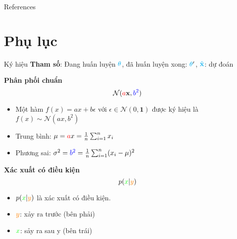 



\begin{frame}[allowframebreaks]{References}
	{\footnotesize
    \printbibliography}
\end{frame}


\appendix

\section{Phụ lục}

\begin{frame}{Ký hiệu}
	\textbf{Tham số}: Đang huấn luyện {\Large$\textcolor{cyan}{\theta}$}, đã huấn luyện xong: {\Large$\textcolor{cyan}{\theta}'$}, {\Large$\textcolor{cyan}{\hat{\mathbf{x}}}$}: dự đoán
	\vspace{-5pt}
	
	\textbf{Phân phối chuẩn}
	\vspace{-5pt}
	{\Large $$\mathcal{N}(\textcolor{red}{a} \mathbf{x}, \textcolor{blue}{b^2})$$}
	\vspace{-15pt}
	\begin{itemize}
		\item Một hàm $f(x) = a x + b\epsilon$ với $\epsilon \in \mathcal{N}(0, \mathbf{1})$ được ký hiệu là $f(x) \sim \mathcal{N}(a x, b^2) $
		
		\item Trung bình: $\mu = \textcolor{red}{a}x=\frac{1}{n} \sum_{i=1}^{n} x_i$
		
		\item Phương sai: $\sigma^2 = \textcolor{blue} {b^2} = \frac{1}{n} \sum_{i=1}^{n} (x_i - \mu)^2$
		
	\end{itemize}
	\textbf{Xác xuất có điều kiện}
	\vspace{-5pt}
	{\Large $$p(\textcolor{green}{x}| \textcolor{orange}{y})$$}
	\vspace{-15pt}
	
	\begin{itemize}
		\item $p(\textcolor{green}{x}| \textcolor{orange}{y})$ là xác xuất có điều kiện.
		\item $\textcolor{orange}{y}$: xảy ra trước (bên phải)
		\item $\textcolor{green}{x}$: sảy ra sau y (bên trái)
	\end{itemize}
	
\end{frame}

